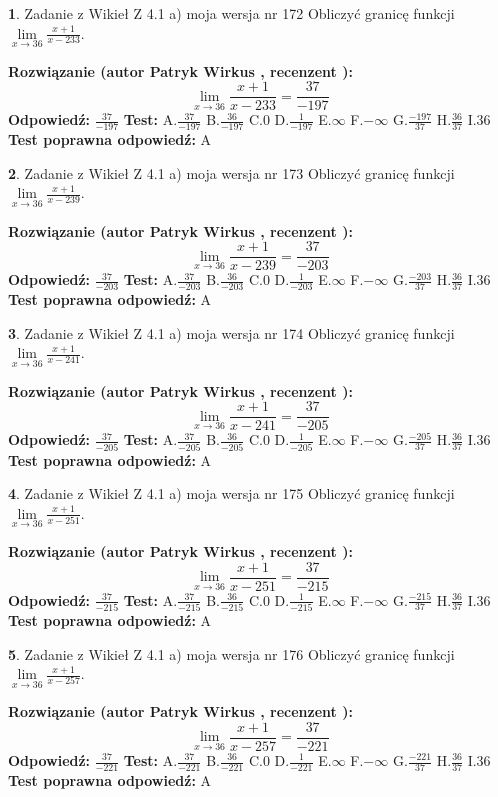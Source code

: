\documentclass[12pt, a4paper]{article}
\theoremstyle{definition} %
\newtheorem{zad}{}
\newcommand{\zadStart}[1]{\begin{zad}#1\newline}
\newcommand{\zadStop}{\end{zad}}
\newcommand{\rozwStart}[2]{\noindent \textbf{Rozwiązanie (autor #1 , recenzent #2): }\newline}
\newcommand{\rozwStop}{\newline}
\newcommand{\odpStart}{\noindent \textbf{Odpowiedź:}\newline}
\newcommand{\odpStop}{\newline}
\newcommand{\testStart}{\noindent \textbf{Test:}\newline}
\newcommand{\testStop}{\newline}
\newcommand{\kluczStart}{\noindent \textbf{Test poprawna odpowiedź:}\newline}
\newcommand{\kluczStop}{\newline}
\begin{document}
\zadStart{Zadanie z Wikieł Z 4.1 a) moja wersja nr 172}
Obliczyć granicę funkcji $\lim\limits_{x\to36}\frac{x+1}{x-233}$.
\zadStop
\rozwStart{Patryk Wirkus}{}
$$\lim\limits_{x\to36}\frac{x+1}{x-233} = \frac{37}{-197}$$
\rozwStop
\odpStart
$\frac{37}{-197}$
\odpStop
\testStart
A.$\frac{37}{-197}$
B.$\frac{36}{-197}$
C.$0$
D.$\frac{1}{-197}$
E.$\infty$
F.$-\infty$
G.$\frac{-197}{37}$
H.$\frac{36}{37}$
I.$36$
\testStop
\kluczStart
A
\kluczStop



\zadStart{Zadanie z Wikieł Z 4.1 a) moja wersja nr 173}
Obliczyć granicę funkcji $\lim\limits_{x\to36}\frac{x+1}{x-239}$.
\zadStop
\rozwStart{Patryk Wirkus}{}
$$\lim\limits_{x\to36}\frac{x+1}{x-239} = \frac{37}{-203}$$
\rozwStop
\odpStart
$\frac{37}{-203}$
\odpStop
\testStart
A.$\frac{37}{-203}$
B.$\frac{36}{-203}$
C.$0$
D.$\frac{1}{-203}$
E.$\infty$
F.$-\infty$
G.$\frac{-203}{37}$
H.$\frac{36}{37}$
I.$36$
\testStop
\kluczStart
A
\kluczStop



\zadStart{Zadanie z Wikieł Z 4.1 a) moja wersja nr 174}
Obliczyć granicę funkcji $\lim\limits_{x\to36}\frac{x+1}{x-241}$.
\zadStop
\rozwStart{Patryk Wirkus}{}
$$\lim\limits_{x\to36}\frac{x+1}{x-241} = \frac{37}{-205}$$
\rozwStop
\odpStart
$\frac{37}{-205}$
\odpStop
\testStart
A.$\frac{37}{-205}$
B.$\frac{36}{-205}$
C.$0$
D.$\frac{1}{-205}$
E.$\infty$
F.$-\infty$
G.$\frac{-205}{37}$
H.$\frac{36}{37}$
I.$36$
\testStop
\kluczStart
A
\kluczStop



\zadStart{Zadanie z Wikieł Z 4.1 a) moja wersja nr 175}
Obliczyć granicę funkcji $\lim\limits_{x\to36}\frac{x+1}{x-251}$.
\zadStop
\rozwStart{Patryk Wirkus}{}
$$\lim\limits_{x\to36}\frac{x+1}{x-251} = \frac{37}{-215}$$
\rozwStop
\odpStart
$\frac{37}{-215}$
\odpStop
\testStart
A.$\frac{37}{-215}$
B.$\frac{36}{-215}$
C.$0$
D.$\frac{1}{-215}$
E.$\infty$
F.$-\infty$
G.$\frac{-215}{37}$
H.$\frac{36}{37}$
I.$36$
\testStop
\kluczStart
A
\kluczStop



\zadStart{Zadanie z Wikieł Z 4.1 a) moja wersja nr 176}
Obliczyć granicę funkcji $\lim\limits_{x\to36}\frac{x+1}{x-257}$.
\zadStop
\rozwStart{Patryk Wirkus}{}
$$\lim\limits_{x\to36}\frac{x+1}{x-257} = \frac{37}{-221}$$
\rozwStop
\odpStart
$\frac{37}{-221}$
\odpStop
\testStart
A.$\frac{37}{-221}$
B.$\frac{36}{-221}$
C.$0$
D.$\frac{1}{-221}$
E.$\infty$
F.$-\infty$
G.$\frac{-221}{37}$
H.$\frac{36}{37}$
I.$36$
\testStop
\kluczStart
A
\kluczStop
\end{document}

